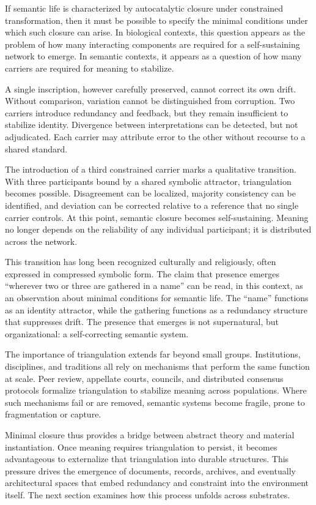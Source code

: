 \documentclass[11pt,oneside]{article}
\begin{document}
If semantic life is characterized by autocatalytic closure under constrained transformation, then it must be possible to specify the minimal conditions under which such closure can arise. In biological contexts, this question appears as the problem of how many interacting components are required for a self-sustaining network to emerge. In semantic contexts, it appears as a question of how many carriers are required for meaning to stabilize.

A single inscription, however carefully preserved, cannot correct its own drift. Without comparison, variation cannot be distinguished from corruption. Two carriers introduce redundancy and feedback, but they remain insufficient to stabilize identity. Divergence between interpretations can be detected, but not adjudicated. Each carrier may attribute error to the other without recourse to a shared standard.

The introduction of a third constrained carrier marks a qualitative transition. With three participants bound by a shared symbolic attractor, triangulation becomes possible. Disagreement can be localized, majority consistency can be identified, and deviation can be corrected relative to a reference that no single carrier controls. At this point, semantic closure becomes self-sustaining. Meaning no longer depends on the reliability of any individual participant; it is distributed across the network.

This transition has long been recognized culturally and religiously, often expressed in compressed symbolic form. The claim that presence emerges “wherever two or three are gathered in a name” can be read, in this context, as an observation about minimal conditions for semantic life. The “name” functions as an identity attractor, while the gathering functions as a redundancy structure that suppresses drift. The presence that emerges is not supernatural, but organizational: a self-correcting semantic system.

The importance of triangulation extends far beyond small groups. Institutions, disciplines, and traditions all rely on mechanisms that perform the same function at scale. Peer review, appellate courts, councils, and distributed consensus protocols formalize triangulation to stabilize meaning across populations. Where such mechanisms fail or are removed, semantic systems become fragile, prone to fragmentation or capture.

Minimal closure thus provides a bridge between abstract theory and material instantiation. Once meaning requires triangulation to persist, it becomes advantageous to externalize that triangulation into durable structures. This pressure drives the emergence of documents, records, archives, and eventually architectural spaces that embed redundancy and constraint into the environment itself. The next section examines how this process unfolds across substrates.
\end{document}
